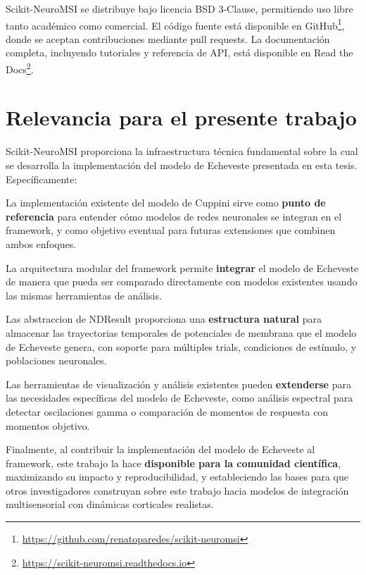 Scikit-NeuroMSI se distribuye bajo licencia BSD 3-Clause, permitiendo uso libre tanto académico como comercial. El código fuente está disponible en GitHub\footnote{\url{https://github.com/renatoparedes/scikit-neuromsi}}, donde se aceptan contribuciones mediante pull requests. La documentación completa, incluyendo tutoriales y referencia de API, está disponible en Read the Docs\footnote{\url{https://scikit-neuromsi.readthedocs.io}}.


\section{Relevancia para el presente trabajo}
\label{sec:snmsi_relevancia}

Scikit-NeuroMSI proporciona la infraestructura técnica fundamental sobre la cual se desarrolla la implementación del modelo de Echeveste presentada en esta tesis. Específicamente:

La implementación existente del modelo de Cuppini sirve como \textbf{punto de referencia} para entender cómo modelos de redes neuronales se integran en el framework, y como objetivo eventual para futuras extensiones que combinen ambos enfoques.

La arquitectura modular del framework permite \textbf{integrar} el modelo de Echeveste de manera que pueda ser comparado directamente con modelos existentes usando las mismas herramientas de análisis.

Las abstraccion de NDResult proporciona una \textbf{estructura natural} para almacenar las trayectorias temporales de potenciales de membrana que el modelo de Echeveste genera, con soporte para múltiples trials, condiciones de estímulo, y poblaciones neuronales.

Las herramientas de visualización y análisis existentes pueden \textbf{extenderse} para las necesidades específicas del modelo de Echeveste, como análisis espectral para detectar oscilaciones gamma o comparación de momentos de respuesta con momentos objetivo.

Finalmente, al contribuir la implementación del modelo de Echeveste al framework, este trabajo la hace \textbf{disponible para la comunidad científica}, maximizando su impacto y reproducibilidad, y estableciendo las bases para que otros investigadores construyan sobre este trabajo hacia modelos de integración multisensorial con dinámicas corticales realistas.